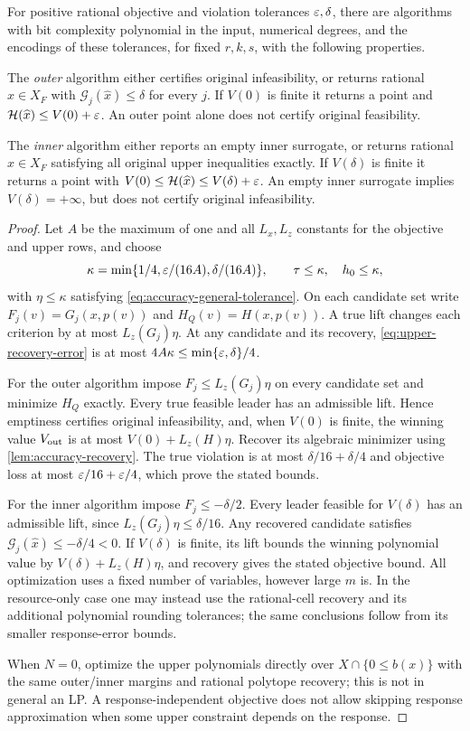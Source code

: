 \begin{theorem}\label{thm:accuracy-upper}
For positive rational objective and violation tolerances $\varepsilon,\delta$,
there are algorithms with bit complexity polynomial in the input,
numerical degrees, and the encodings of these tolerances, for fixed
$r,k,s$, with the following properties.

The \emph{outer} algorithm either certifies original infeasibility, or
returns rational $\widehat x\in X_F$ with
$\mathcal G_j(\widehat x)\le\delta$ for every $j$.
If $V(0)$ is finite it returns a point and
$\mathcal H(\widehat x)\le V(0)+\varepsilon$.
An outer point alone does not certify original feasibility.

The \emph{inner} algorithm either reports an empty inner surrogate, or
returns rational $\widehat x\in X_F$ satisfying all original upper
inequalities exactly. If $V(\delta)$ is finite it returns a point with
$V(0)\le\mathcal H(\widehat x)\le V(\delta)+\varepsilon$.
An empty inner surrogate implies $V(\delta)=+\infty$, but does not
certify original infeasibility.
\end{theorem}
\begin{proof}
Let $A$ be the maximum of one and all $L_x,L_z$ constants for the
objective and upper rows, and choose
\[
 \kappa=\min\{1/4,\varepsilon/(16A),\delta/(16A)\},\qquad
 \tau\le\kappa,\quad h_0\le\kappa,
\]
with $\eta\le\kappa$ satisfying
\eqref{eq:accuracy-general-tolerance}. On each candidate set write
$F_j(v)=G_j(x,p(v))$ and $H_Q(v)=H(x,p(v))$.
A true lift changes each criterion by at most $L_z(G_j)\eta$.
At any candidate and its recovery, \eqref{eq:upper-recovery-error}
is at most $4A\kappa\le\min\{\varepsilon,\delta\}/4$.

For the outer algorithm impose $F_j\le L_z(G_j)\eta$ on every
candidate set and minimize $H_Q$ exactly. Every true feasible leader
has an admissible lift. Hence emptiness certifies original infeasibility,
and, when $V(0)$ is finite, the winning value $V_{\rm out}$ is at
most $V(0)+L_z(H)\eta$. Recover its algebraic minimizer using
\cref{lem:accuracy-recovery}. The true violation is at most
$\delta/16+\delta/4$ and objective loss at most
$\varepsilon/16+\varepsilon/4$, which prove the stated bounds.

For the inner algorithm impose $F_j\le-\delta/2$.
Every leader feasible for $V(\delta)$ has an admissible lift, since
$L_z(G_j)\eta\le\delta/16$. Any recovered candidate satisfies
$\mathcal G_j(\widehat x)\le-\delta/4<0$. If $V(\delta)$ is
finite, its lift bounds the winning polynomial value by
$V(\delta)+L_z(H)\eta$, and recovery gives the stated objective
bound. All optimization uses a fixed number of variables, however
large $m$ is. In the resource-only case one may instead use the
rational-cell recovery and its additional polynomial rounding tolerances;
the same conclusions follow from its smaller response-error bounds.

When $N=0$, optimize the upper polynomials directly over
$X\cap\{0\le b(x)\}$ with the same outer/inner margins and rational
polytope recovery; this is not in general an LP. A
response-independent objective does not allow skipping response
approximation when some upper constraint depends on the response.
\end{proof}


